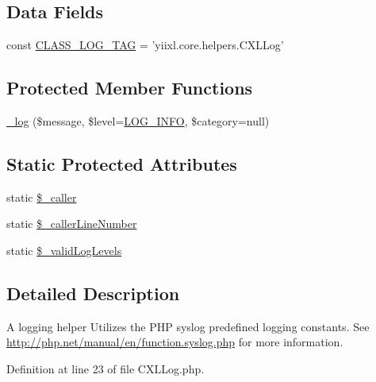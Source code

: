 \subsection*{Data Fields}
\begin{DoxyCompactItemize}
\item 
const \hyperlink{classCXLLog_aa607ab5e557e6ebb60b85c5a20ad067f}{CLASS\_\-LOG\_\-TAG} = 'yiixl.core.helpers.CXLLog'
\end{DoxyCompactItemize}
\subsection*{Protected Member Functions}
\begin{DoxyCompactItemize}
\item 
\hyperlink{classCXLLog_a04d7843ce3340c0a92f05fc31116b954}{\_\-log} (\$message, \$level=\hyperlink{interfaceIXLLogger_a951775da27343035f4aa2c323df714f4}{LOG\_\-INFO}, \$category=null)
\end{DoxyCompactItemize}
\subsection*{Static Protected Attributes}
\begin{DoxyCompactItemize}
\item 
static \hyperlink{classCXLLog_aa70290a86387975ab9608f6287417443}{\$\_\-caller}
\item 
static \hyperlink{classCXLLog_a14345e9f074575d9f774e70533a51264}{\$\_\-callerLineNumber}
\item 
static \hyperlink{classCXLLog_a939fa17840a3090aae1372c6c1cdb756}{\$\_\-validLogLevels}
\end{DoxyCompactItemize}


\subsection{Detailed Description}
A logging helper Utilizes the PHP syslog predefined logging constants. See \hyperlink{}{http://php.net/manual/en/function.syslog.php} for more information. 

Definition at line 23 of file CXLLog.php.



